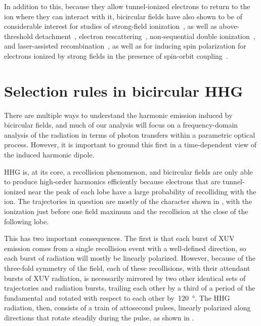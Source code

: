 In addition to this, because they allow tunnel-ionized electrons to return to the ion where they can interact with it, bicircular fields have also shown to be of considerable interest for studies of strong-field ionization~\cite{ mancuso_bicircular-ionization_2015,mancuso_bicircular-rescattering_2016,ngoko-starace_multistart-spiral-ionization_2016, milosevic_bicircular-ionization-sfa_2016, chaloupka_bicircular-double-ionization_2016}, as well as above-threshold detachment~\cite{kramo_bicircular-atd_2007}, electron rescattering~\cite{hasovic_rescattering-bicircular_2016}, non-sequential double ionization~\cite{eckart_bicircular-nsdi_2016},  and laser-assisted recombination~\cite{odzak_bicircular-laser-assisted-recombination_2015}, as well as for inducing spin polarization for electrons ionized by strong fields in the presence of spin-orbit coupling~\cite{ milosevic_bicircular-spin-polarization_2016, hartung_spin-polarization-ionization_2016}.











\section{Selection rules in bicircular HHG}
\label{sec:hhg-selection-rules}
There are multiple ways to understand the harmonic emission induced by bicircular fields, and much of our analysis will focus on a frequency-domain analysis of the radiation in terms of photon transfers within a parametric optical process. However, it is important to ground this first in a time-dependent view of the induced harmonic dipole.


HHG is, at its core, a recollision phenomenon, and bicircular fields are only able to produce high-order harmonics efficiently because electrons that are tunnel-ionized near the peak of each lobe have a large probability of recolliding with the ion. The trajectories in question are mostly of the  character shown in , with the ionization just before one field maximum and the recollision at the close of the following lobe. 

This has two important consequences. The first is that each burst of XUV emission comes from a single recollision event with a well-defined direction, so each burst of radiation will mostly be linearly polarized. However, because of the three-fold symmetry of the field, each of these recollisions, with their attendant bursts of XUV radiation, is necessarily mirrored by two other identical sets of trajectories and radiation bursts, trailing each other by a third of a period of the fundamental and rotated with respect to each other by~\SI{120}{\degree}. The HHG radiation, then, consists of a train of attosecond pulses, linearly polarized along directions that rotate steadily during the pulse, as shown in .






